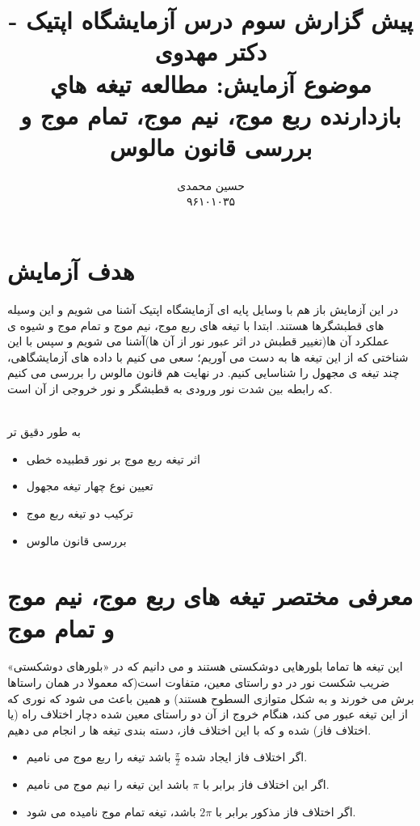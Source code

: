 \documentclass{article}
\title{	
	پیش گزارش سوم درس آزمایشگاه اپتیک - دکتر مهدوی
	\\
	\small
	موضوع آزمايش: مطالعه تيغه هاي بازدارنده ربع موج، نيم موج، تمام موج و بررسی قانون مالوس
}
\author{
حسین محمدی 
\\
۹۶۱۰۱۰۳۵
}
\begin{document}
\maketitle
\section{هدف آزمایش}
در این آزمایش باز هم با وسایل پایه ای آزمایشگاه اپتیک آشنا می شویم و این وسیله های قطبشگرها هستند. ابتدا با تیغه های ربع موج، نیم موج و تمام موج و شیوه ی عملکرد آن ها(تغییر قطبش در اثر عبور نور از آن ها)آشنا می شویم و سپس با این شناختی که از این تیغه ها به دست می آوریم؛ سعی می کنیم با داده های آزمایشگاهی، چند تیغه ی مجهول را شناسایی کنیم. در نهایت هم قانون مالوس را بررسی می کنیم که رابطه بین شدت نور ورودی به قطبشگر و نور خروجی از آن است.

\noindent  \\
به طور دقیق تر
\begin{itemize}
	\item  اثر تیغه ربع موج بر نور قطبیده خطی
	\item تعیین نوع چهار تیغه مجهول
	\item ترکیب دو تیغه ربع موج
	\item بررسی قانون مالوس
\end{itemize}
\section{معرفی مختصر تیغه های ربع موج، نیم موج و تمام موج}
این تیغه ها تماما بلورهایی دوشکستی هستند و می دانیم که در «بلورهای دوشکستی» ضریب شکست نور در دو راستای معین، متفاوت است(که معمولا در همان راستاها برش می خورند و به شکل متوازی السطوح هستند) و همین باعث می شود که نوری که  از این تیغه عبور می کند، هنگام خروج از آن دو راستای معین شده دچار اختلاف راه (یا اختلاف فاز) شده و که با این اختلاف فاز، دسته بندی تیغه ها ر انجام می دهیم.

\noindent
\begin{itemize}
	\item
	اگر اختلاف فاز ایجاد شده
	$\frac{\pi}{2}$
	باشد تیغه را ربع موج می نامیم.
	\item اگر این اختلاف فاز برابر با 
	$\pi$
	باشد این تیغه را نیم موج می نامیم.
	\item
	اگر اختلاف فاز مذکور برابر با 
	$2\pi$
	باشد، تیغه تمام موج نامیده می شود.
\end{itemize}
\end{document}
